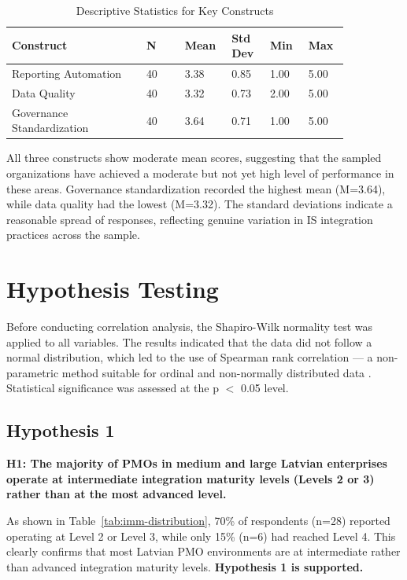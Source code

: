 {\singlespacing
\begin{table}[h]
  \caption{Descriptive Statistics for Key Constructs}
  \label{tab:descriptive}
  \centering
  \begin{tabular}{p{0.35\linewidth}p{0.10\linewidth}p{0.10\linewidth}p{0.10\linewidth}p{0.10\linewidth}p{0.10\linewidth}}
    \toprule
    \textbf{Construct} & \textbf{N} & \textbf{Mean} & \textbf{Std Dev}
    & \textbf{Min} & \textbf{Max}\\
    \midrule
    Reporting Automation & 40 & 3.38 & 0.85 & 1.00 & 5.00\\
    Data Quality & 40 & 3.32 & 0.73 & 2.00 & 5.00\\
    Governance Standardization & 40 & 3.64 & 0.71 & 1.00 & 5.00\\
    \bottomrule
  \end{tabular}
\end{table}
}

All three constructs show moderate mean scores, suggesting that the
sampled organizations have achieved a moderate but not yet high level
of performance in these areas. Governance standardization recorded
the highest mean (M=3.64), while data quality had the lowest (M=3.32).
The standard deviations indicate a reasonable spread of responses,
reflecting genuine variation in IS integration practices across the
sample.

\section{Hypothesis Testing}
\label{sec:hypotheses}

Before conducting correlation analysis, the Shapiro-Wilk normality
test was applied to all variables. The results indicated that the
data did not follow a normal distribution, which led to the use of
Spearman rank correlation — a non-parametric method suitable for
ordinal and non-normally distributed data \cite{field2018}.
Statistical significance was assessed at the p $<$ 0.05 level.

\subsection{Hypothesis 1}
\textbf{H1: The majority of PMOs in medium and large Latvian
enterprises operate at intermediate integration maturity levels
(Levels 2 or 3) rather than at the most advanced level.}

As shown in Table~\ref{tab:imm-distribution}, 70\% of respondents
(n=28) reported operating at Level 2 or Level 3, while only 15\%
(n=6) had reached Level 4. This clearly confirms that most Latvian
PMO environments are at intermediate rather than advanced integration
maturity levels. \textbf{Hypothesis 1 is supported.}

